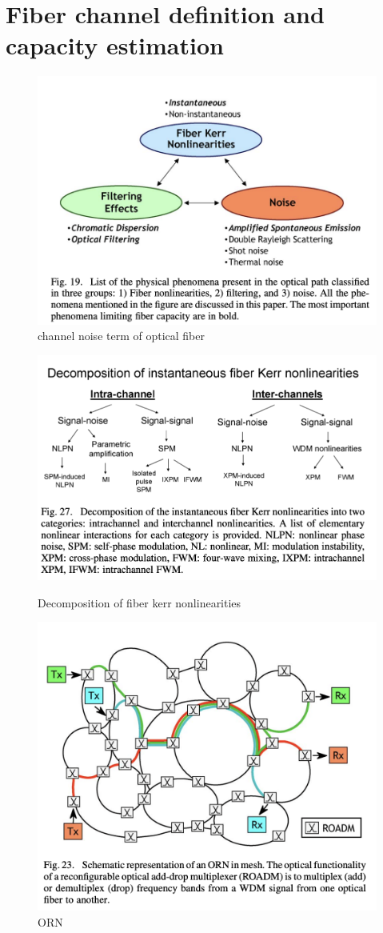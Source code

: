 \section{Fiber channel definition and capacity estimation}

\begin{figure}[htbp]
\centering
\includegraphics[width=0.5\linewidth]{img/noise.png}
\caption{channel noise term of optical fiber}
\label{noise of optical fiber}
\end{figure}

\begin{figure}[htbp]
\centering
\includegraphics[width=0.5\linewidth]{img/nonlinearity.png}
\label{nopnlinearity}
\caption{Decomposition of fiber kerr nonlinearities}
\end{figure}

\begin{figure}
\centering
\includegraphics[width=0.5\linewidth]{img/ORN.png}
\caption{ORN}
\label{ORn}
\end{figure}

